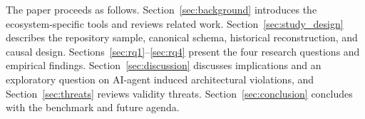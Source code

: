 The paper proceeds as follows. Section~\ref{sec:background} introduces the ecosystem-specific tools and reviews related work. Section~\ref{sec:study_design} describes the repository sample, canonical schema, historical reconstruction, and causal design. Sections~\ref{sec:rq1}--\ref{sec:rq4} present the four research questions and empirical findings. Section~\ref{sec:discussion} discusses implications and an exploratory question on AI-agent induced architectural violations, and Section~\ref{sec:threats} reviews validity threats. Section~\ref{sec:conclusion} concludes with the benchmark and future agenda.

